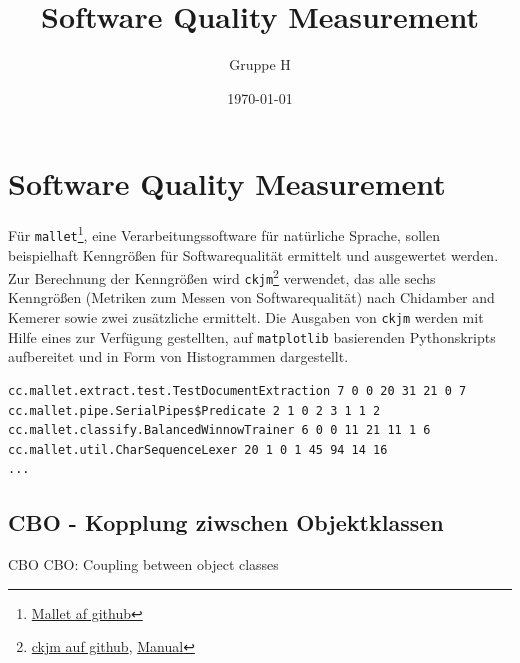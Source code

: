 \documentclass{scrreprt}
\title{Software Quality Measurement}
\author{Gruppe H}
\date{\today}
\newcommand{\lstx}[1]{\lstinline$#1$}
\begin{document}
\maketitle
\tableofcontents

\chapter{Software Quality Measurement}

Für \lstx{mallet}\footnote{\href{https://github.com/mimno/Mallet}{Mallet af github}}, eine Verarbeitungssoftware für natürliche Sprache, sollen beispielhaft Kenngrößen für Softwarequalität ermittelt und ausgewertet werden. Zur Berechnung der Kenngrößen wird \lstx{ckjm}\footnote{\href{https://github.com/dspinellis/ckjm}{ckjm auf github},  \href{https://www.spinellis.gr/sw/ckjm/doc/indexw.html}{Manual}} verwendet, das alle sechs Kenngrößen (Metriken zum Messen von Softwarequalität) nach Chidamber and Kemerer sowie zwei zusätzliche ermittelt. Die Ausgaben von \lstx{ckjm} werden mit Hilfe eines zur Verfügung gestellten, auf \lstx{matplotlib} basierenden Pythonskripts aufbereitet und in Form von Histogrammen dargestellt.

\begin{lstlisting}[caption = Beispiele für den Output von mallet]
cc.mallet.extract.test.TestDocumentExtraction 7 0 0 20 31 21 0 7
cc.mallet.pipe.SerialPipes$Predicate 2 1 0 2 3 1 1 2
cc.mallet.classify.BalancedWinnowTrainer 6 0 0 11 21 11 1 6
cc.mallet.util.CharSequenceLexer 20 1 0 1 45 94 14 16
...
\end{lstlisting}



\section{CBO - Kopplung ziwschen Objektklassen}
CBO 
CBO: Coupling between object classes
\end{document}
